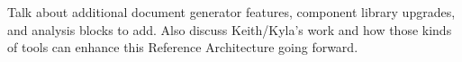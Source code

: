 Talk about additional document generator features, component library upgrades, and analysis blocks to add. Also discuss Keith/Kyla's work and how those kinds of tools can enhance this Reference Architecture going forward.